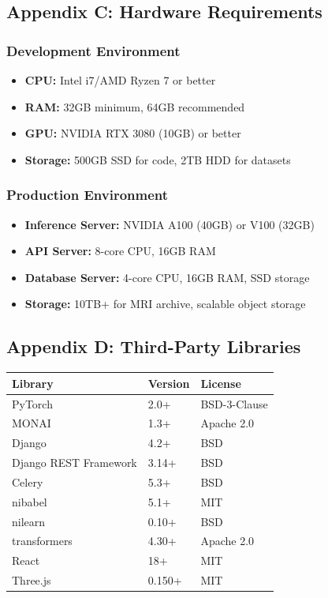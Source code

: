 \documentclass[12pt,a4paper]{article}
\begin{document}
\subsection{Appendix C: Hardware Requirements}

\subsubsection{Development Environment}
\begin{itemize}
    \item \textbf{CPU:} Intel i7/AMD Ryzen 7 or better
    \item \textbf{RAM:} 32GB minimum, 64GB recommended
    \item \textbf{GPU:} NVIDIA RTX 3080 (10GB) or better
    \item \textbf{Storage:} 500GB SSD for code, 2TB HDD for datasets
\end{itemize}

\subsubsection{Production Environment}
\begin{itemize}
    \item \textbf{Inference Server:} NVIDIA A100 (40GB) or V100 (32GB)
    \item \textbf{API Server:} 8-core CPU, 16GB RAM
    \item \textbf{Database Server:} 4-core CPU, 16GB RAM, SSD storage
    \item \textbf{Storage:} 10TB+ for MRI archive, scalable object storage
\end{itemize}

\subsection{Appendix D: Third-Party Libraries}

\begin{table}[H]
\centering
\begin{tabularx}{\textwidth}{|l|l|X|}
\hline
\textbf{Library} & \textbf{Version} & \textbf{License} \\
\hline
PyTorch & 2.0+ & BSD-3-Clause \\
\hline
MONAI & 1.3+ & Apache 2.0 \\
\hline
Django & 4.2+ & BSD \\
\hline
Django REST Framework & 3.14+ & BSD \\
\hline
Celery & 5.3+ & BSD \\
\hline
nibabel & 5.1+ & MIT \\
\hline
nilearn & 0.10+ & BSD \\
\hline
transformers & 4.30+ & Apache 2.0 \\
\hline
React & 18+ & MIT \\
\hline
Three.js & 0.150+ & MIT \\
\hline
\end{tabularx}
\end{table}
\end{document}
